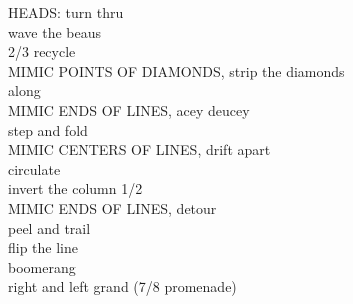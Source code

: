 \documentclass[12pt]{article}
\begin{document}
HEADS: turn thru\\
wave the beaus\\
2/3 recycle\\
MIMIC POINTS OF DIAMONDS, strip the diamonds\\
along\\
MIMIC ENDS OF LINES, acey deucey\\
step and fold\\
MIMIC CENTERS OF LINES, drift apart\\
circulate\\
invert the column 1/2\\
MIMIC ENDS OF LINES, detour\\
peel and trail\\
flip the line\\
boomerang\\
right and left grand  (7/8 promenade)\\
\endsequence
\end{document}
